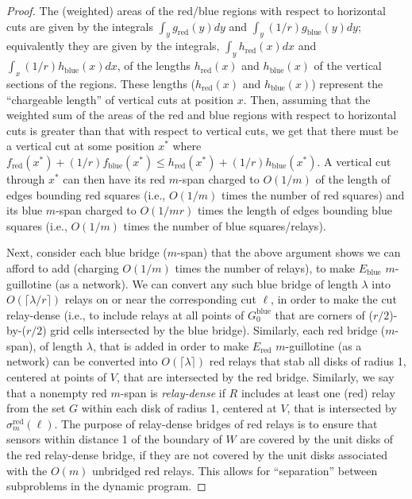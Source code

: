 \documentclass[11pt,a4paper]{article}
\newcommand{\ceil}[1]{\lceil{#1}\rceil}
\newcommand{\blue}{\text{blue}}
\newcommand{\red}{\text{red}}
\theoremstyle{definition}
\theoremstyle{remark}
\begin{document}
\begin{proof}
The (weighted) areas of the red/blue regions with respect to
horizontal cuts are given by the integrals $\int_y g_{\red}(y) dy$ and
$\int_y (1/r)g_{\blue}(y) dy$; equivalently they are given by the integrals,
$\int_y h_{\red}(x) dx$ and $\int_x (1/r)h_{\blue}(x) dx$, of the lengths
$h_{\red}(x)$ and $h_{\blue}(x)$ of the vertical sections of the regions.  These
lengths ($h_{\red}(x)$ and $h_{\blue}(x)$) represent the ``chargeable length'' of
vertical cuts at position $x$.  Then, assuming that the weighted sum
of the areas of the red and blue regions with respect to horizontal
cuts is greater than that with respect to vertical cuts, we get that
there must be a vertical cut at some position $x^*$ where
$f_{\red}(x^*)+(1/r)f_{\blue}(x^*) \leq h_{\red}(x^*) + (1/r)h_{\blue}(x^*)$.  A vertical
cut through $x^*$ can then have its red $m$-span charged to $O(1/m)$
of the length of edges bounding red squares (i.e., $O(1/m)$ times the
number of red squares) and its blue $m$-span charged to $O(1/mr)$
times the length of edges bounding blue squares (i.e., $O(1/m)$ times
the number of blue squares/relays).

Next, consider each blue bridge ($m$-span) that the above argument
shows we can afford to add (charging $O(1/m)$ times the number of
relays), to make $E_{\blue}$ $m$-guillotine (as a network).  We can convert
any such blue bridge of length $\lambda$ into $O(\ceil{\lambda/r})$
relays on or near the corresponding cut $\ell$, in order to make the
cut relay-dense (i.e., to include relays at all points of $G_0^{\blue}$ that
are corners of ($r/2$)-by-($r/2$) grid cells intersected by the blue
bridge).
Similarly, each red bridge ($m$-span), of length $\lambda$, that is added in order to make
$E_{\red}$ $m$-guillotine (as a network) can be converted into $O(\ceil{\lambda})$
red relays that stab all disks of radius 1, centered at points of $V$, that are
intersected by the red bridge.
Similarly, we say that a nonempty red $m$-span is {\em relay-dense} if
$R$ includes at least one (red) relay from the set $G$ within each disk of radius 1,
centered at $V$, that is intersected by $\sigma_m^{\red}(\ell)$.
The purpose of relay-dense bridges of red relays is to ensure that
sensors within distance 1 of the boundary of $W$ are covered by the unit disks
of the red relay-dense bridge, if they are not covered by
the unit disks associated with the $O(m)$ unbridged red relays.  This allows for ``separation''
between subproblems in the dynamic program.


\end{proof}
\end{document}
